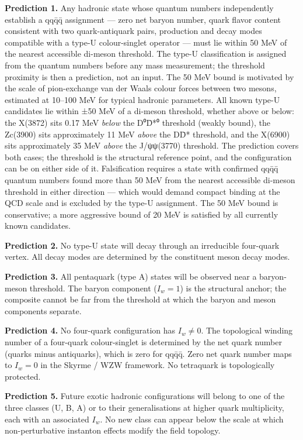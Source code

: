 \textbf{Prediction 1.} Any hadronic state whose quantum numbers
independently establish a qqq̄q̄ assignment --- zero net baryon number,
quark flavor content consistent with two quark-antiquark pairs,
production and decay modes compatible with a type-U colour-singlet
operator --- must lie within 50 MeV of the nearest accessible di-meson
threshold. The type-U classification is assigned from the quantum
numbers before any mass measurement; the threshold proximity is then a
prediction, not an input. The 50 MeV bound is motivated by the scale of
pion-exchange van der Waals colour forces between two mesons, estimated
at 10--100 MeV for typical hadronic parameters. All known type-U
candidates lie within ±50 MeV of a di-meson threshold, whether above or
below: the X(3872) sits 0.17 MeV \emph{below} the D⁰D̄*⁰ threshold
(weakly bound), the Zc(3900) sits approximately 11 MeV \emph{above} the
DD̄* threshold, and the X(6900) sits approximately 35 MeV \emph{above}
the J/ψψ(3770) threshold. The prediction covers both cases; the
threshold is the structural reference point, and the configuration can
be on either side of it. Falsification requires a state with confirmed
qqq̄q̄ quantum numbers found more than 50 MeV from the nearest accessible
di-meson threshold in either direction --- which would demand compact
binding at the QCD scale and is excluded by the type-U assignment. The
50 MeV bound is conservative; a more aggressive bound of 20 MeV is
satisfied by all currently known candidates.

\textbf{Prediction 2.} No type-U state will decay through an irreducible
four-quark vertex. All decay modes are determined by the constituent
meson decay modes.

\textbf{Prediction 3.} All pentaquark (type A) states will be observed
near a baryon-meson threshold. The baryon component (\(I_w = 1\)) is the
structural anchor; the composite cannot be far from the threshold at
which the baryon and meson components separate.

\textbf{Prediction 4.} No four-quark configuration has \(I_w \neq 0\).
The topological winding number of a four-quark colour-singlet is
determined by the net quark number (quarks minus antiquarks), which is
zero for qqq̄q̄. Zero net quark number maps to \(I_w = 0\) in the Skyrme /
WZW framework. No tetraquark is topologically protected.

\textbf{Prediction 5.} Future exotic hadronic configurations will belong
to one of the three classes (U, B, A) or to their
generalisations at higher quark multiplicity, each with an associated
\(I_w\). No new class can appear below the scale at which
non-perturbative instanton effects modify the field topology.

